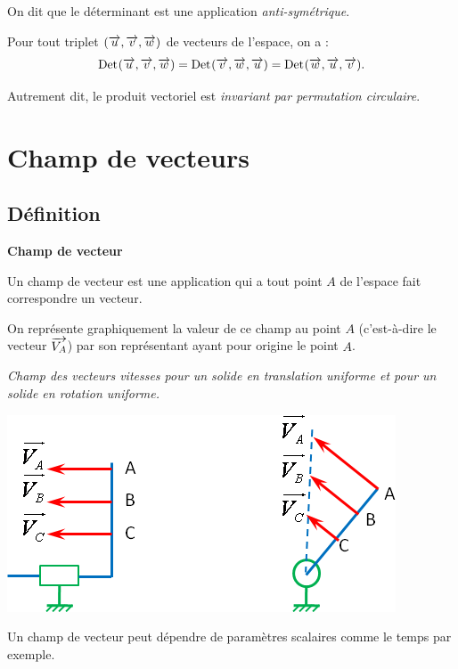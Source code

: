 \documentclass[10pt,oneside]{article}
\newcommand{\Det}{\mathrm{Det}\hspace{.2mm}}
\begin{document}
\begin{rem}

On dit que le déterminant est une application \emph{anti-symétrique}.
\end{rem}

\begin{coro}
Pour tout triplet $(\overrightarrow{u}, \overrightarrow{v}, \overrightarrow{w})$ de vecteurs de l'espace, on a :
$$\Det(\vect{u},\vect{v}, \vect{w})=\Det(\vect{v},\vect{w}, \vect{u})=\Det(\vect{w},\vect{u}, \vect{v}).$$

Autrement dit, le produit vectoriel est \emph{invariant par permutation circulaire}.\\
\end{coro}


\section{Champ de vecteurs}
\subsection{Définition}
\begin{defi}
\textbf{Champ de vecteur}

Un champ de vecteur est une application qui a tout point $A$ de l'espace fait correspondre un vecteur. 
\end{defi}

On représente graphiquement la valeur de ce champ au point 
$A$ (c'est-à-dire le vecteur $\overrightarrow{V_A}$) par son représentant ayant pour origine le point $A$. 

\begin{exemple}
\textit{Champ des vecteurs vitesses pour un solide en translation uniforme et pour un solide en rotation uniforme.}

\begin{center}
\includegraphics[width=.5\textwidth]{png/champs}
\end{center}

\end{exemple}
Un champ de vecteur peut dépendre de paramètres scalaires comme le temps par exemple. 
\end{document}
